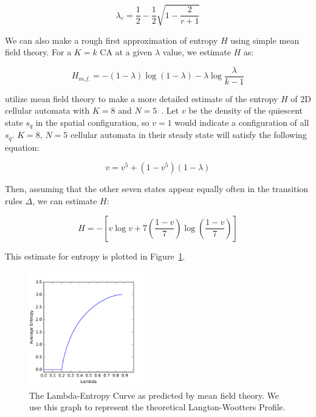 \documentclass[a4paper,11pt]{article}
\begin{document}
\begin{equation}
\lambda_c = \frac{1}{2} - \frac{1}{2}\sqrt{1 - \frac{2}{r+1}}
\end{equation}

We can also make a rough first approximation of entropy $H$ using simple mean field theory. For a $K=k$ CA at a given $\lambda$ value, we estimate $H$ as:

\begin{equation}
H_{m.f.} = - (1- \lambda) \log (1-\lambda) - \lambda \log \frac{\lambda}{k-1}
\end{equation}

\citeauthor{wo90} utilize mean field theory to make a more detailed estimate of the entropy $H$ of 2D cellular automata with $K=8$ and $N=5$~\cite{wo90}. Let $v$ be the density of the quiescent state $s_q$ in the spatial configuration, so $v=1$ would indicate a configuration of all $s_q$. $K=8$, $N=5$ cellular automata in their steady state will satisfy the following equation:

\begin{equation}
v = v^5 + (1 - v^5)(1- \lambda)
\end{equation}

\noindent Then, assuming that the other seven states appear equally often in the transition rules $\Delta$, we can estimate $H$:

\begin{equation}
H = -\left[ v \log v + 7\left(\frac{1-v}{7}\right)\log\left(\frac{1-v}{7}\right)\right]
\end{equation}

\noindent This estimate for entropy is plotted in Figure~\ref{fig:mft_lambda}.

\begin{figure}[htp]
\centering
\includegraphics[width=0.45\textwidth]{app_figs/mft_lambda}
\caption[Mean Field Theory Lambda-Entropy Curve]{
	The Lambda-Entropy Curve as predicted by mean field theory. We use this graph to represent the theoretical Langton-Wootters Profile.
}
\label{fig:mft_lambda}
\end{figure}

\processdelayedfloats

\clearpage



\end{document}
